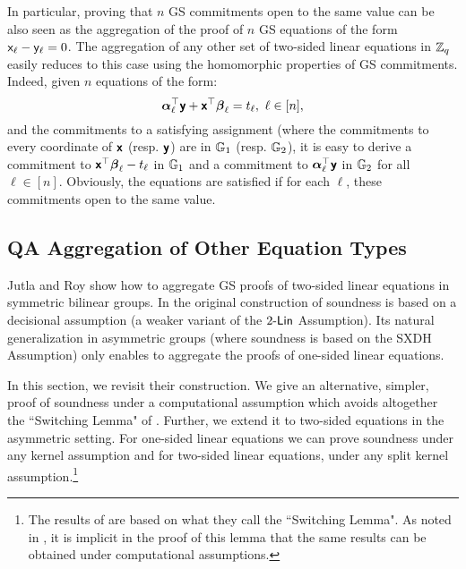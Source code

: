 In particular, proving that $n$ GS commitments open to the same value can be also seen as the aggregation of the proof  of $n$ GS equations of the form $\mathsf{x}_\ell -\mathsf{y}_\ell=0$. The aggregation of any other set of two-sided linear equations in $\mathbb{Z}_q$
easily reduces to this case using the homomorphic properties of GS commitments. Indeed, given $n$ equations of the form:
 $$  {\boldsymbol \alpha}_{\ell}^{\top} \textbf{\textsf{y}}+ \textbf{\textsf{x}}^{\top}\boldsymbol \beta_{\ell} =t_\ell, \ \ell \in [n],$$
 and the commitments to a satisfying assignment (where the commitments to every coordinate of $\textbf{\textsf{x}}$ (resp. $\textbf{\textsf{y}}$) are in $\mathbb{G}_1$ (resp. $\mathbb{G}_2$), it is easy to derive a commitment to $\textbf{\textsf{x}}^{\top} {\boldsymbol \beta}_{\ell}- t_{\ell}$ in $\mathbb{G}_1$ and a commitment to  ${\boldsymbol \alpha}_{\ell}^{\top} \textbf{\textsf{y}}$ in $\mathbb{G}_2$ for all $\ell \in [n]$. Obviously, the equations are satisfied if for each $\ell$, these commitments open to the same value. 


\subsection{QA Aggregation of Other Equation Types} \label{sec:jutroyaggasym}
Jutla and Roy \cite{C:JutRoy14} show how to aggregate GS proofs of 
two-sided linear equations in symmetric bilinear groups. In the original construction of \cite{C:JutRoy14} soundness is based on a decisional assumption (a weaker variant of the $2\mbox{-}\mathsf{Lin}$ Assumption). Its natural generalization in asymmetric groups (where soundness is based on the SXDH Assumption) only enables to aggregate the proofs of one-sided linear equations. 

In this section, we revisit their construction. We give an alternative, simpler, proof of soundness under a computational assumption which avoids altogether the ``Switching Lemma" of \cite{C:JutRoy14}. Further, we extend it to two-sided equations in the asymmetric setting. For one-sided linear equations we can prove soundness under any kernel assumption and for two-sided linear equations, under any split kernel assumption.\footnote{The results of  \cite{C:JutRoy14} are based on what they call  the ``Switching Lemma". As noted in \cite{EPRINT:MorRafVil15}, it is implicit in the proof of this lemma that the same results can be obtained under computational assumptions.}

